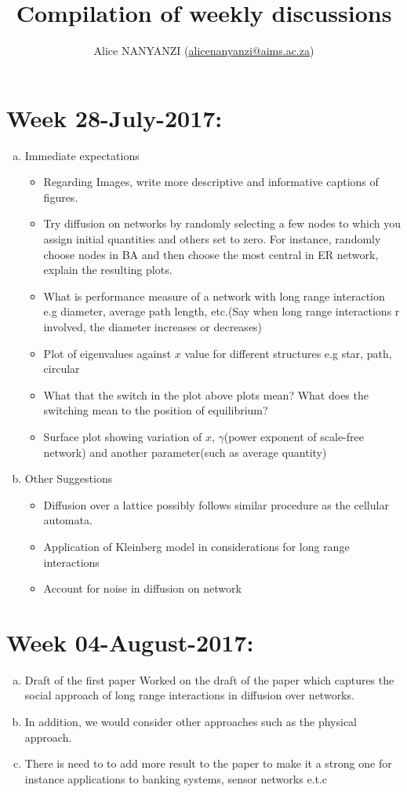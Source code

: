 \documentclass[10pt,a4paper]{article}
\author{Alice NANYANZI (\href{mailto:alicenanyanzi@aims.ac.za}{alicenanyanzi@aims.ac.za})}
\title{Compilation of weekly discussions}
\begin{document}
\maketitle
\section*{Week 28-July-2017:}
\begin{enumerate}[a)]
	\item Immediate expectations
\begin{itemize}
	\item Regarding Images, write more descriptive and  informative captions of figures.
	\item Try diffusion on networks by randomly selecting a few nodes to which you assign initial quantities and others set to zero. For instance, randomly choose nodes in BA and then choose the most central in ER network, explain the resulting plots.
	\item What is performance measure of a network with long range interaction e.g diameter, average path length, etc.(Say when long range interactions r involved, the diameter increases or decreases)
	\item Plot of eigenvalues against $x$ value for different structures e.g star, path, circular
	\item What that the switch in the plot above plots mean? What does the switching mean to the position of equilibrium?
	\item Surface plot showing variation of $x$, $\gamma$(power exponent of scale-free network) and another parameter(such as average quantity)
\end{itemize}
\item Other Suggestions
\begin{itemize}
	\item Diffusion over a lattice possibly follows similar procedure as the cellular automata.
	\item Application of Kleinberg model in considerations for long range interactions
	\item Account for noise in diffusion on network
\end{itemize}
\end{enumerate}

\section*{Week 04-August-2017:}
\begin{enumerate}[a)]
	\item Draft of the first paper
	Worked on the draft of the paper which captures the social approach of long range interactions in diffusion over networks.
	\item In addition, we would consider other approaches such as the physical approach.
	\item There is need to to add more result to the paper to make it a strong one for instance applications to banking systems, sensor networks e.t.c
\end{enumerate}
\end{document}
